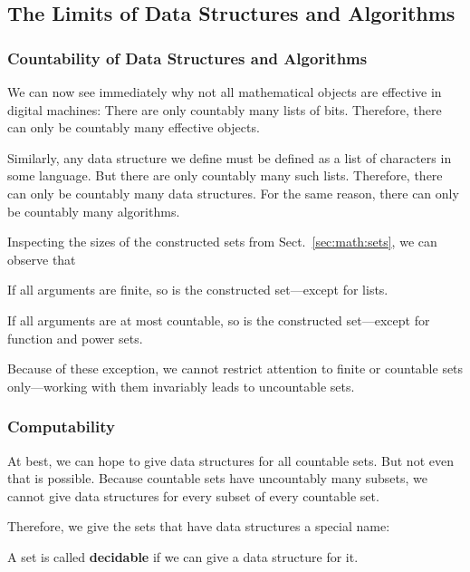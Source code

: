 \subsection{The Limits of Data Structures and Algorithms}\label{sec:ad:computable}

\subsubsection{Countability of Data Structures and Algorithms}

We can now see immediately why not all mathematical objects are effective in digital machines: There are only countably many lists of bits.
Therefore, there can only be countably many effective objects.

Similarly, any data structure we define must be defined as a list of characters in some language.
But there are only countably many such lists.
Therefore, there can only be countably many data structures.
For the same reason, there can only be countably many algorithms.
\medskip

Inspecting the sizes of the constructed sets from Sect.~\ref{sec:math:sets}, we can observe that
\begin{compactitem}
\item If all arguments are finite, so is the constructed set---except for lists.
\item If all arguments are at most countable, so is the constructed set---except for function and power sets.
\end{compactitem}
Because of these exception, we cannot restrict attention to finite or countable sets only---working with them invariably leads to uncountable sets.

\subsubsection{Computability}

At best, we can hope to give data structures for all countable sets.
But not even that is possible.
Because countable sets have uncountably many subsets, we cannot give data structures for every subset of every countable set.

Therefore, we give the sets that have data structures a special name:

\begin{definition}[Decidable]
A set is called \textbf{decidable} if we can give a data structure for it.
\end{definition}

